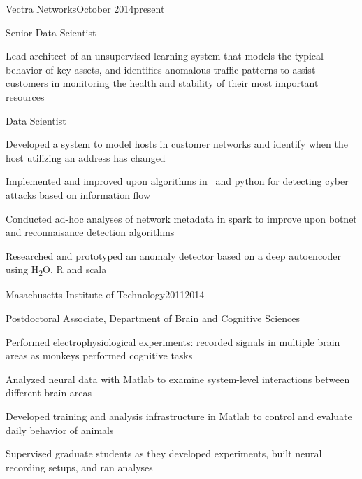 \documentclass{report}
\begin{document}
  \begin{work_location}{Vectra Networks}{October 2014}{present}

    \begin{position}{Senior Data Scientist}
      \item Lead architect of an unsupervised learning system that models the typical behavior of key assets, and identifies anomalous traffic patterns to assist customers in monitoring the health and stability of their most important resources
    \end{position}

    \begin{position}{Data Scientist}
      \item Developed a system to model hosts in customer networks and identify when the host utilizing an address has changed
      \item Implemented and improved upon algorithms in \CC~and python for detecting cyber attacks based on information flow
      \item Conducted ad-hoc analyses of network metadata in spark to improve upon botnet and reconnaisance detection algorithms
      \item Researched and prototyped an anomaly detector based on a deep autoencoder using H\textsubscript{2}O, R and scala
    \end{position}

  \end{work_location}



  \begin{work_location}{Masachusetts Institute of Technology}{2011}{2014}

    \begin{position}{Postdoctoral Associate, Department of Brain and Cognitive Sciences}
      \item {} Performed electrophysiological experiments: recorded signals in multiple brain areas as monkeys performed cognitive tasks
      \item Analyzed neural data with Matlab to examine system-level interactions between different brain areas
      \item Developed training and analysis infrastructure in Matlab to control and evaluate daily behavior of animals
      \item Supervised graduate students as they developed experiments, built neural recording setups, and ran analyses
    \end{position}

  \end{work_location}
\end{document}
